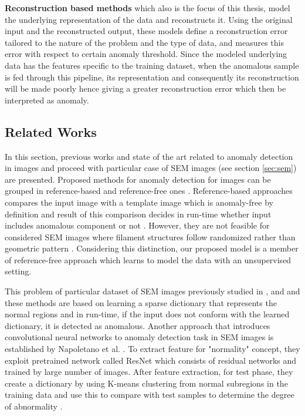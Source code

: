 \textbf{Reconstruction based methods} which also is the focus of this thesis, model the underlying
representation of the data and reconstructs it. Using the original input and the reconstructed
output, these models define a reconstruction error tailored to the nature of the problem and the
type of data, and measures this error with respect to certain anomaly threshold. Since the modeled
underlying data has the features specific to the training dataset, when the anomalous sample is
fed through this pipeline, its representation and consequently its reconstruction will be made
poorly hence giving a greater reconstruction error which then be interpreted as anomaly. 

\subsection{Related Works}
\label{sec:relworks}

In this section, previous works and state of the art related to anomaly detection in images 
and proceed with particular case of SEM images (see section \ref{sec:sem}) are presented. Proposed 
methods for anomaly detection for images can be grouped in reference-based and reference-free ones 
\cite{Chandola:2009:ADS:1541880.1541882}. Reference-based approaches compares the input image with a 
template image which is anomaly-free by definition and result of this comparison decides in run-time 
whether input includes anomalous component or not \cite{zontak2010defect}.
However, they are not feasible for considered SEM images where filament structures follow
randomized rather than geometric pattern \cite{carrera2016defect}. Considering this distinction, our proposed model 
is a member of reference-free approach which learns to model the data with an unsupervised setting.

This problem of particular dataset of SEM images previously studied in \cite{carrera2016defect},
\cite{carrera-2016-scale} and \cite{boracchi2014novelty} and these methods are based on learning a 
sparse dictionary that represents the normal regions and in run-time, if the input does not conform 
with the learned dictionary, it is detected as anomalous. Another approach that introduces convolutional 
neural networks to anomaly detection task in SEM images is established by Napoletano et al. \cite{Napoletano2018anomaly}. 
To extract feature for "normality" concept, they exploit pretrained network called ResNet \cite{he2016deep} 
which consists of residual networks and trained by large number of images. After feature extraction, 
for test phase, they create a dictionary by using K-means clustering from normal subregions in the training data 
and use this to compare with test samples to determine the degree of abnormality \cite{Napoletano2018anomaly}.

